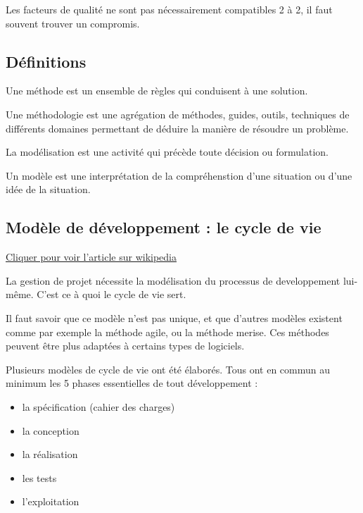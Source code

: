 Les facteurs de qualité ne sont pas nécessairement compatibles 2 à 2, il
faut souvent trouver un compromis.

\hypertarget{duxe9finitions}{%
\subsection{Définitions}\label{duxe9finitions}}

Une méthode est un ensemble de règles qui conduisent à une solution.

Une méthodologie est une agrégation de méthodes, guides, outils,
techniques de différents domaines permettant de déduire la manière de
résoudre un problème.

La modélisation est une activité qui précède toute décision ou
formulation.

Un modèle est une interprétation de la compréhenstion d'une situation ou
d'une idée de la situation.

\hypertarget{moduxe8le-de-duxe9veloppement-le-cycle-de-vie}{%
\subsection{Modèle de développement : le cycle de
vie}\label{moduxe8le-de-duxe9veloppement-le-cycle-de-vie}}

\href{https://fr.wikipedia.org/wiki/Cycle_de_d\%C3\%A9veloppement_(logiciel)}{Cliquer pour voir
l'article sur wikipedia}

La gestion de projet nécessite la modélisation du processus de
developpement lui-même. C'est ce à quoi le cycle de vie sert.

Il faut savoir que ce modèle n'est pas unique, et que d'autres modèles
existent comme par exemple la méthode agile, ou la méthode merise. Ces
méthodes peuvent être plus adaptées à certains types de logiciels.

Plusieurs modèles de cycle de vie ont été élaborés. Tous ont en commun
au minimum les 5 phases essentielles de tout développement :

\begin{itemize}
\tightlist
\item
  la spécification (cahier des charges)
\item
  la conception
\item
  la réalisation
\item
  les tests
\item
  l'exploitation
\end{itemize}

